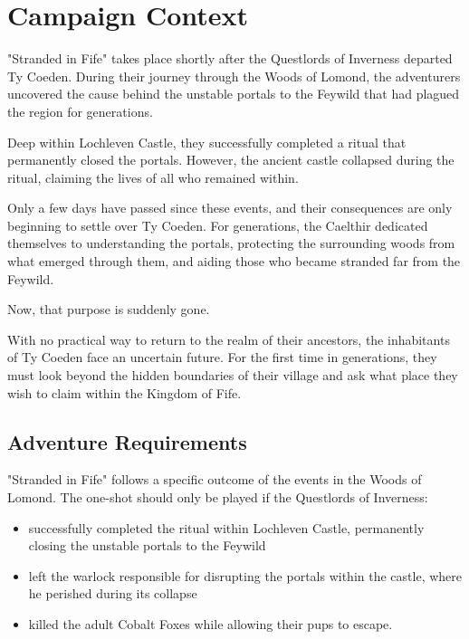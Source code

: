 \section*{\LARGE Campaign Context}
{\entryfont "Stranded in Fife" takes place shortly after the Questlords of Inverness departed Ty Coeden. During their journey through the Woods of Lomond, the adventurers uncovered the cause behind the unstable portals to the Feywild that had plagued the region for generations.

Deep within Lochleven Castle, they successfully completed a ritual that permanently closed the portals. However, the ancient castle collapsed during the ritual, claiming the lives of all who remained within.

Only a few days have passed since these events, and their consequences are only beginning to settle over Ty Coeden. For generations, the Caelthir dedicated themselves to understanding the portals, protecting the surrounding woods from what emerged through them, and aiding those who became stranded far from the Feywild.

Now, that purpose is suddenly gone.

With no practical way to return to the realm of their ancestors, the inhabitants of Ty Coeden face an uncertain future. For the first time in generations, they must look beyond the hidden boundaries of their village and ask what place they wish to claim within the Kingdom of Fife.}

\subsection*{Adventure Requirements}
{\entryfont "Stranded in Fife" follows a specific outcome of the events in the Woods of Lomond. The one-shot should only be played if the Questlords of Inverness:
\begin{itemize}
	\item successfully completed the ritual within Lochleven Castle, permanently closing the unstable portals to the Feywild
	\item left the warlock responsible for disrupting the portals within the castle, where he perished during its collapse
	\item killed the adult Cobalt Foxes while allowing their pups to escape.
\end{itemize}}